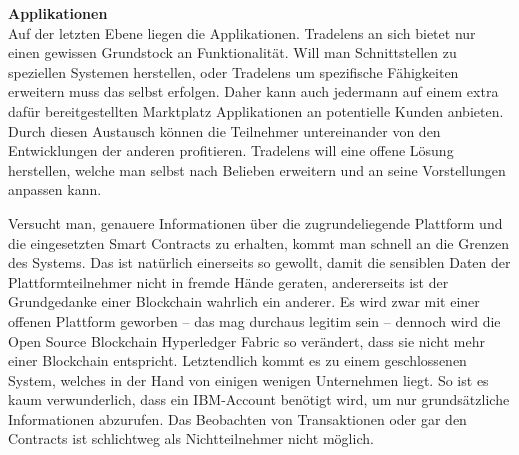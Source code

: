 \textbf{Applikationen}\\
Auf der letzten Ebene liegen die Applikationen. Tradelens an sich bietet nur einen gewissen Grundstock an Funktionalität. Will man Schnittstellen zu speziellen Systemen herstellen, oder Tradelens um spezifische Fähigkeiten erweitern muss das selbst erfolgen. Daher kann auch jedermann auf einem extra dafür bereitgestellten Marktplatz Applikationen an potentielle Kunden anbieten. Durch diesen Austausch können die Teilnehmer untereinander von den Entwicklungen der anderen profitieren. Tradelens will eine offene Lösung herstellen, welche man selbst nach Belieben erweitern und an seine Vorstellungen anpassen kann. \cite[vgl.][S. 5]{Tradelens2019b}

Versucht man, genauere Informationen über die zugrundeliegende Plattform und die eingesetzten Smart Contracts zu erhalten, kommt man schnell an die Grenzen des Systems. Das ist natürlich einerseits so gewollt, damit die sensiblen Daten der Plattformteilnehmer nicht in fremde Hände geraten, andererseits ist der Grundgedanke einer Blockchain wahrlich ein anderer. Es wird zwar mit einer offenen Plattform geworben -- das mag durchaus legitim sein -- dennoch wird die Open Source Blockchain Hyperledger Fabric so verändert, dass sie nicht mehr einer Blockchain entspricht. Letztendlich kommt es zu einem geschlossenen System, welches in der Hand von einigen wenigen Unternehmen liegt. So ist es kaum verwunderlich, dass ein IBM-Account benötigt wird, um nur grundsätzliche Informationen abzurufen. Das Beobachten von Transaktionen oder gar den Contracts ist schlichtweg als Nichtteilnehmer nicht möglich.

